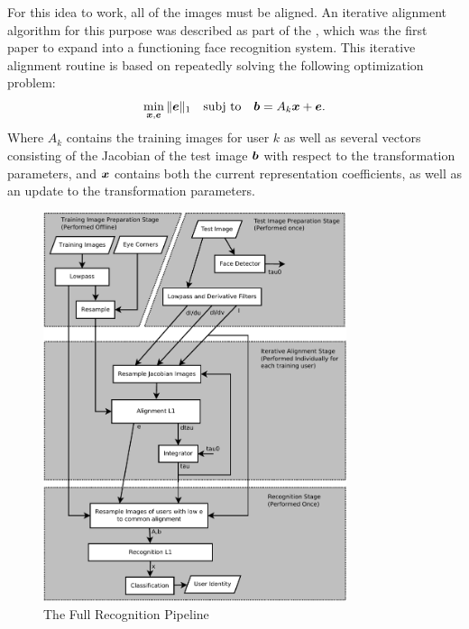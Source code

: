 \documentclass[10pt,twocolumn,letterpaper]{article}
\begin{document}
For this idea to work, all of the images must be aligned. An iterative alignment
algorithm for this purpose was described as part of the \cite{Wagner2009-CVPR}, which was
the first paper to expand \cite{Wright2009-PAMI} into a functioning face recognition system.
This iterative alignment routine is based on repeatedly solving the following optimization problem:
\begin{equation}
\min_{{\boldsymbol{x}}, \boldsymbol{e}} \|\boldsymbol{e}\|_1 \quad \textup{subj to} \quad \boldsymbol{b} = A_k {\boldsymbol{x}} + \boldsymbol{e}.
\end{equation}
Where $A_k$ contains the training images for user $k$ as well as several vectors consisting of the
Jacobian of the test image $\boldsymbol{b}$ with respect to the transformation parameters, and ${\boldsymbol{x}}$ contains
both the current representation coefficients, as well as an update to the transformation parameters.

\begin{figure}
\centering
\includegraphics[width=3.5in]{figures/pipeline.pdf}
\caption{The Full Recognition Pipeline}
\label{fig:pipeline}
\end{figure}
\end{document}
